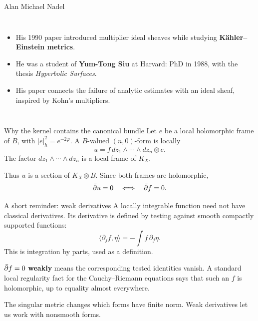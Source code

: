 \begin{frame}{Alan Michael Nadel}
\begin{columns}[c]
\centering
{}
\begin{itemize}
\setlength{\itemsep}{16pt}
\item His 1990 paper introduced multiplier ideal sheaves while studying \textbf{Kähler--Einstein metrics}.
\item He was a student of \textbf{Yum-Tong Siu} at Harvard: PhD in 1988, with the thesis \emph{Hyperbolic Surfaces}.
\item His paper connects the failure of analytic estimates with an ideal sheaf, inspired by Kohn's multipliers.
\end{itemize}
\end{columns}
\end{frame}

\begin{frame}{Why the kernel contains the canonical bundle}
Let \(e\) be a local holomorphic frame of \(B\), with \(|e|_h^2=e^{-2\varphi}\).
A \(B\)-valued \((n,0)\)-form is locally
\[
u=f\,dz_1\wedge\cdots\wedge dz_n\otimes e.
\]
The factor \(dz_1\wedge\cdots\wedge dz_n\) is a local frame of \(K_X\).
\par\medskip
Thus \(u\) is a section of \(K_X\otimes B\). Since both frames are holomorphic,
\[
\bar\partial u=0\quad\Longleftrightarrow\quad\bar\partial f=0.
\]
\end{frame}

\begin{frame}{A short reminder: weak derivatives}
A locally integrable function need not have classical derivatives. Its derivative is defined by testing against smooth compactly supported functions:
\[
\langle\partial_jf,\eta\rangle=-\int f\,\partial_j\eta.
\]
This is integration by parts, used as a definition.
\par\medskip
\(\bar\partial f=0\) \textbf{weakly} means the corresponding tested identities vanish.
A standard local regularity fact for the Cauchy--Riemann equations says that such an \(f\) is holomorphic, up to equality almost everywhere.
\par\medskip
The singular metric changes which forms have finite norm. Weak derivatives let us work with nonsmooth forms.
\end{frame}

